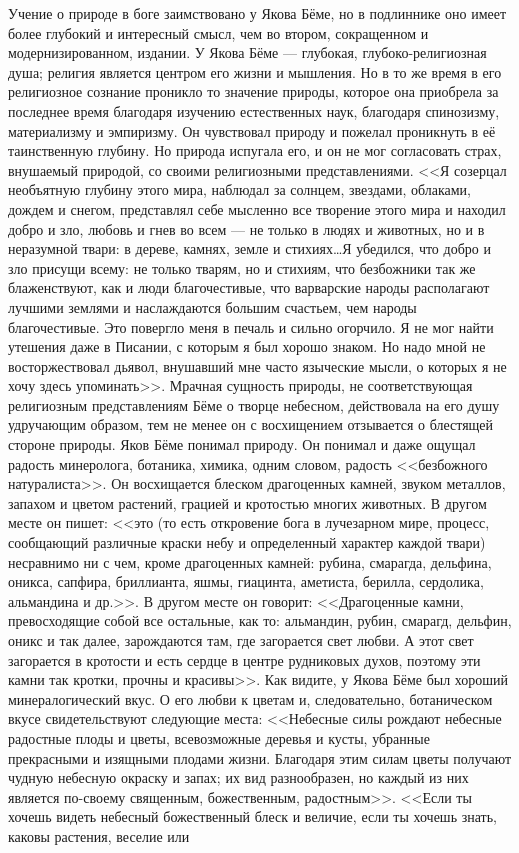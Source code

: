 \documentclass[12pt,oneside]{book}
\begin{document}
Учение о природе в боге заимствовано у Якова Бёме, но в подлиннике оно имеет более глубокий и интересный смысл, чем во втором, сокращенном и модернизированном, издании. У Якова Бёме --- глубокая, глубоко-религиозная душа; религия является центром его жизни и мышления. Но в то же время в его религиозное сознание проникло то значение природы, которое она приобрела за последнее время благодаря изучению естественных наук, благодаря спинозизму, материализму и эмпиризму. Он чувствовал природу и пожелал проникнуть в её таинственную глубину. Но природа испугала его, и он не мог согласовать страх, внушаемый природой, со своими религиозными представлениями. <<Я созерцал необъятную глубину этого мира, наблюдал за солнцем, звездами, облаками, дождем и снегом, представлял себе мысленно все творение этого мира и находил добро и зло, любовь и гнев во всем --- не только в людях и животных, но и в неразумной твари: в дереве, камнях, земле и стихиях\dots Я убедился, что добро и зло присущи всему: не только тварям, но и стихиям, что безбожники так же блаженствуют, как и люди благочестивые, что варварские народы располагают лучшими землями и наслаждаются большим счастьем, чем народы благочестивые. Это повергло меня в печаль и сильно огорчило. Я не мог найти утешения даже в Писании, с которым я был хорошо знаком. Но надо мной не восторжествовал дьявол, внушавший мне часто языческие мысли, о которых я не хочу здесь упоминать>>\dag\let\svthefootnote\thefootnote\let\thefootnote\relax{}\let\thefootnote\svthefootnote. Мрачная сущность природы, не соответствующая религиозным представлениям Бёме о творце небесном, действовала на его душу удручающим образом, тем не менее он с восхищением отзывается о блестящей стороне природы. Яков Бёме понимал природу. Он понимал и даже ощущал радость минеролога, ботаника, химика, одним словом, радость <<безбожного натуралиста>>. Он восхищается блеском драгоценных камней, звуком металлов, запахом и цветом растений, грацией и кротостью многих животных. В другом месте он пишет: <<это (то есть откровение бога в лучезарном мире, процесс, сообщающий различные краски небу и определенный характер каждой твари) несравнимо ни с чем, кроме драгоценных камней: рубина, смарагда, дельфина, оникса, сапфира, бриллианта, яшмы, гиацинта, аметиста, берилла, сердолика, альмандина и др.>>. В другом месте он говорит: <<Драгоценные камни, превосходящие собой все остальные, как то: альмандин, рубин, смарагд, дельфин, оникс и так далее, зарождаются там, где загорается свет любви. А этот свет загорается в кротости и есть сердце в центре рудниковых духов, поэтому эти камни так кротки, прочны и красивы>>. Как видите, у Якова Бёме был хороший минералогический вкус. О его любви к цветам и, следовательно, ботаническом вкусе свидетельствуют следующие места: <<Небесные силы рождают небесные радостные плоды и цветы, всевозможные деревья и кусты, убранные прекрасными и изящными плодами жизни. Благодаря этим силам цветы получают чудную небесную окраску и запах; их вид разнообразен, но каждый из них является по-своему священным, божественным, радостным>>. <<Если ты хочешь видеть небесный божественный блеск и величие, если ты хочешь знать, каковы растения, веселие или 
\end{document}
